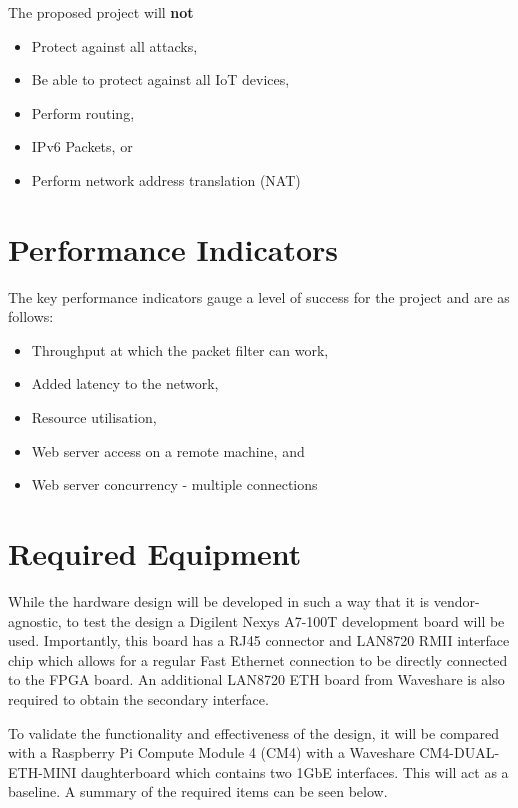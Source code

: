 The proposed project will \textbf{not}
\begin{itemize}
    \item Protect against all attacks,
    \item Be able to protect against all IoT devices,
    \item Perform routing,
    \item IPv6 Packets, or
    \item Perform network address translation (NAT)
\end{itemize}



\section{Performance Indicators}
The key performance indicators gauge a level of success for the project and are as follows: 

\begin{itemize}
    \item Throughput at which the packet filter can work,
    \item Added latency to the network,
    \item Resource utilisation,
    \item Web server access on a remote machine, and
    \item Web server concurrency - multiple connections
\end{itemize}



\section{Required Equipment}
While the hardware design will be developed in such a way that it is vendor-agnostic, to test the design a Digilent Nexys A7-100T development board will be used.
Importantly, this board has a RJ45 connector and LAN8720 RMII interface chip which allows for a regular Fast Ethernet connection to be directly connected 
to the FPGA board. An additional LAN8720 ETH board from Waveshare is also required to obtain the secondary interface. 

To validate the functionality and effectiveness of the design, it will be compared with a Raspberry Pi Compute Module 4 (CM4) with a Waveshare CM4-DUAL-ETH-MINI 
daughterboard which contains two 1GbE interfaces. This will act as a baseline. A summary of the required items can be seen below.

